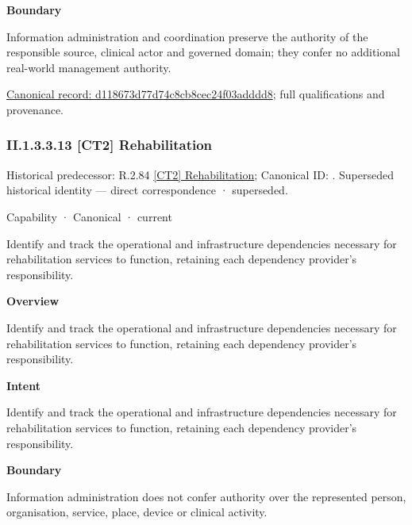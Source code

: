 \textbf{Boundary}



Information administration and coordination preserve the authority of the responsible source, clinical actor and governed domain; they confer no additional real-world management authority.


{\footnotesize \href{../../../../../../../continuum/strategy/capability/d118673d77d74c8cb8cec24f03adddd8.md}{Canonical record: d118673d77d74c8cb8cec24f03adddd8}; full qualifications and provenance.}\par
\subsubsection*{II.1.3.3.13 [CT2] Rehabilitation}
\label{navigation:II.1.3.3.13}

{\small Historical predecessor: R.2.84 \hyperref[element:28ec21d5918a49aaac12740c69f42d77]{[CT2] Rehabilitation}; Canonical ID: \texttt{}. Superseded historical identity — direct correspondence · superseded.}\par
\label{element:99ed51abcc5e4e8ba3b3d0161b17544a}
{\small Capability · Canonical · current}\par

Identify and track the operational and infrastructure dependencies necessary for rehabilitation services to function, retaining each dependency provider's responsibility.



\textbf{Overview}



Identify and track the operational and infrastructure dependencies necessary for rehabilitation services to function, retaining each dependency provider's responsibility.



\textbf{Intent}



Identify and track the operational and infrastructure dependencies necessary for rehabilitation services to function, retaining each dependency provider's responsibility.



\textbf{Boundary}



Information administration does not confer authority over the represented person, organisation, service, place, device or clinical activity.



